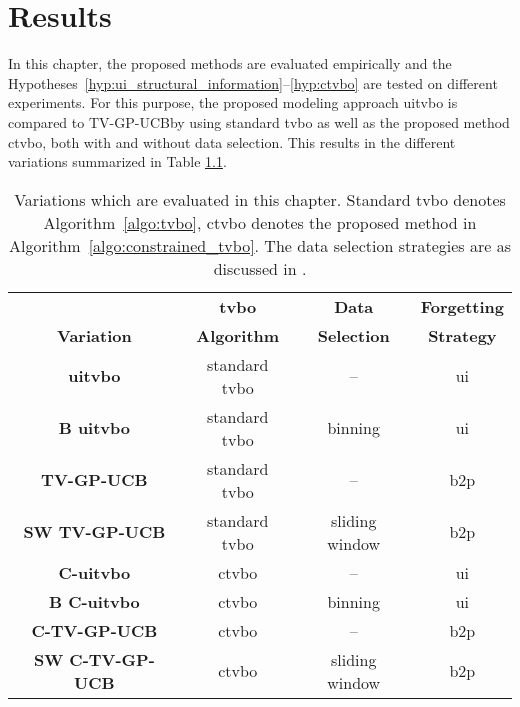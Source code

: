 \chapter{Results}
\label{chap:results}

In this chapter, the proposed methods are evaluated empirically and the Hypotheses~\ref{hyp:ui_structural_information}--\ref{hyp:ctvbo} are tested on different experiments. For this purpose, the proposed modeling approach \gls{uitvbo} is compared to TV-GP-UCB\footnotemark by \textcite{Bogunovic_2016} using standard \gls{tvbo} as well as the proposed method \gls{ctvbo}, both with and without data selection. This results in the different variations summarized in Table \ref{tab:models}.

\bgroup
\def\arraystretch{1.2}
\begin{table}[h]
\begin{center}
\begin{tabular}{ c || c | c | c}
 & \textbf{\gls{tvbo}} & \textbf{Data}& \textbf{Forgetting}\vspace{-0.1cm}\\
\textbf{Variation} & \textbf{Algorithm} & \textbf{Selection} & \textbf{Strategy}\\\hline\hline
\textbf{\gls{uitvbo}} & standard \gls{tvbo} & -- & \gls{ui} \\\hline
\textbf{B \gls{uitvbo}} & standard \gls{tvbo} & binning & \gls{ui} \\\hline
\textbf{TV-GP-UCB}\footnotemark[\value{footnote}] & standard \gls{tvbo} & -- & \gls{b2p} \\\hline
\textbf{SW TV-GP-UCB}\footnotemark[\value{footnote}] & standard \gls{tvbo} & sliding window & \gls{b2p} \\\hline
\textbf{C-\gls{uitvbo}} & \gls{ctvbo} & -- & \gls{ui} \\\hline
\textbf{B C-\gls{uitvbo}} & \gls{ctvbo} & binning & \gls{ui} \\\hline
\textbf{C-TV-GP-UCB}\footnotemark[\value{footnote}] & \gls{ctvbo} & -- & \gls{b2p} \\\hline
\textbf{SW C-TV-GP-UCB}\footnotemark[\value{footnote}] & \gls{ctvbo} & sliding window & \gls{b2p} \\\hline
\end{tabular}
\end{center}
\caption[Evaluated model variations.]{Variations which are evaluated in this chapter. Standard \gls{tvbo} denotes Algorithm~\ref{algo:tvbo}, \gls{ctvbo} denotes the proposed method in Algorithm~\ref{algo:constrained_tvbo}. The data selection strategies are as discussed in .}
\label{tab:models}
\end{table}
\egroup
{}

